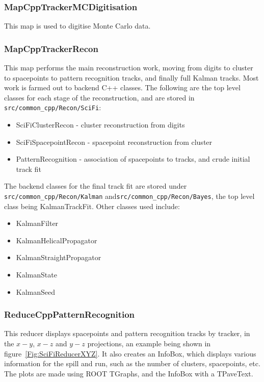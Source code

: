 \subsubsection{MapCppTrackerMCDigitisation}
This map is used to digitise Monte Carlo data.

\subsubsection{MapCppTrackerRecon}
This map performs the main reconstruction work, moving from digits to cluster to spacepoints to pattern recognition tracks, and finally full Kalman tracks. Most work is farmed out to backend C++ classes. The following are the top level classes for each stage of the reconstruction, and are stored in \verb;src/common_cpp/Recon/SciFi;:

\begin{itemize}
 \item SciFiClusterRecon - cluster reconstruction from digits
 \item SciFiSpacepointRecon - spacepoint reconstruction from cluster
 \item PatternRecognition - association of spacepoints to tracks, and crude initial track fit
\end{itemize}
The backend classes for the final track fit are stored under \verb;src/common_cpp/Recon/Kalman; and\linebreak\verb;src/common_cpp/Recon/Bayes;, the top level class being KalmanTrackFit. Other classes used include:

\begin{itemize}
 \item KalmanFilter
 \item KalmanHelicalPropagator
 \item KalmanStraightPropagator
 \item KalmanState
 \item KalmanSeed
\end{itemize}

\subsubsection{ReduceCppPatternRecognition}
This reducer displays spacepoints and pattern recognition tracks by tracker, in the $x-y$, $x-z$ and $y-z$ projections, an example being shown in figure~\ref{Fig:SciFiReducerXYZ}.  It also creates an InfoBox, which displays various information for the spill and run, such as the number of clusters, spacepoints, etc.  The plots are made using ROOT TGraphs, and the InfoBox with a TPaveText. 

